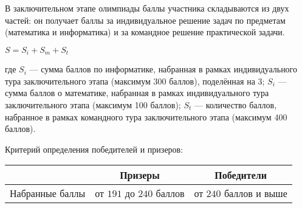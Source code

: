 В заключительном этапе олимпиады баллы участника складываются
из двух частей: он получает баллы за индивидуальное решение задач по
предметам (математика и информатика) и за командное решение
практической задачи.

\begin{center}
    $S = S_i + S_m + S_t$
\end{center}

где $S_i$ --- сумма баллов по информатике, набранная в рамках индивидуального
тура заключительного этапа (максимум 300 баллов), поделённая на 3; $S_i$ ---
сумма баллов о математике, набранная в рамках индивидуального тура
заключительного этапа (максимум 100 баллов); $S_t$ --- количество баллов,
набранное в рамках командного тура заключительного этапа (максимум
400 баллов).

Критерий определения победителей и призеров:

\begin{center}
\begin{tabular}{ |c|c|c| }
 \hline
  & \textbf{Призеры} & \textbf{Победители} \\
 \hline
 Набранные баллы & от $191$ до $240$ баллов & от $240$ баллов и выше \\
 \hline
\end{tabular}
\end{center}
